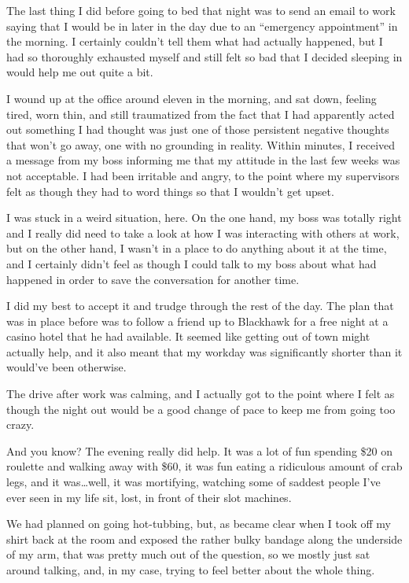 The last thing I did before going to bed that night was to send an email to work saying that I would be in later in the day due to an ``emergency appointment'' in the morning. I certainly couldn't tell them what had actually happened, but I had so thoroughly exhausted myself and still felt so bad that I decided sleeping in would help me out quite a bit.

I wound up at the office around eleven in the morning, and sat down, feeling tired, worn thin, and still traumatized from the fact that I had apparently acted out something I had thought was just one of those persistent negative thoughts that won't go away, one with no grounding in reality. Within minutes, I received a message from my boss informing me that my attitude in the last few weeks was not acceptable. I had been irritable and angry, to the point where my supervisors felt as though they had to word things so that I wouldn't get upset.

I was stuck in a weird situation, here. On the one hand, my boss was totally right and I really did need to take a look at how I was interacting with others at work, but on the other hand, I wasn't in a place to do anything about it at the time, and I certainly didn't feel as though I could talk to my boss about what had happened in order to save the conversation for another time.

I did my best to accept it and trudge through the rest of the day. The plan that was in place before was to follow a friend up to Blackhawk for a free night at a casino hotel that he had available. It seemed like getting out of town might actually help, and it also meant that my workday was significantly shorter than it would've been otherwise.

The drive after work was calming, and I actually got to the point where I felt as though the night out would be a good change of pace to keep me from going too crazy.

And you know? The evening really did help. It was a lot of fun spending \$20 on roulette and walking away with \$60, it was fun eating a ridiculous amount of crab legs, and it was\ldots{}well, it was mortifying, watching some of saddest people I've ever seen in my life sit, lost, in front of their slot machines.

We had planned on going hot-tubbing, but, as became clear when I took off my shirt back at the room and exposed the rather bulky bandage along the underside of my arm, that was pretty much out of the question, so we mostly just sat around talking, and, in my case, trying to feel better about the whole thing.

